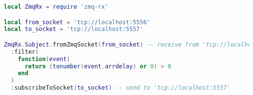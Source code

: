 \begin{lstlisting}[language=LUA,caption={Process pipeline with Zmq-RxLua: filter.},label=rx-processing-filter-event]
local ZmqRx = require 'zmq-rx'

local from_socket = 'tcp://localhost:5556'
local to_socket = 'tcp://localhost:5557'

ZmqRx.Subject.fromZmqSocket(from_socket) -- receive from 'tcp://localhost:5556'
  :filter(
    function(event)
      return (tonumber(event.arrdelay) or 0) > 0
    end
  )
  :subscribeToSocket(to_socket) -- send to 'tcp://localhost:5557'
\end{lstlisting}

